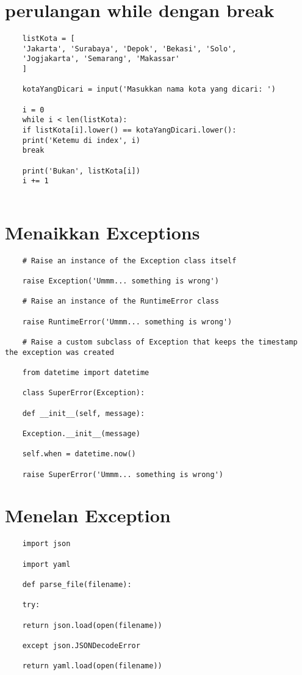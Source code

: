 \documentclass{article}
\begin{document}
\section {perulangan while dengan break}
\begin{lstlisting}
	listKota = [
	'Jakarta', 'Surabaya', 'Depok', 'Bekasi', 'Solo',
	'Jogjakarta', 'Semarang', 'Makassar'
	]
	
	kotaYangDicari = input('Masukkan nama kota yang dicari: ')
	
	i = 0
	while i < len(listKota):
	if listKota[i].lower() == kotaYangDicari.lower():
	print('Ketemu di index', i)
	break
	
	print('Bukan', listKota[i])
	i += 1
	
\end{lstlisting}

\section {Menaikkan Exceptions}
\begin{lstlisting}
	# Raise an instance of the Exception class itself
	
	raise Exception('Ummm... something is wrong')
	
	# Raise an instance of the RuntimeError class
	
	raise RuntimeError('Ummm... something is wrong')
	
	# Raise a custom subclass of Exception that keeps the timestamp the exception was created
	
	from datetime import datetime
	
	class SuperError(Exception):
	
	def __init__(self, message):
	
	Exception.__init__(message)
	
	self.when = datetime.now()
	
	raise SuperError('Ummm... something is wrong')
\end{lstlisting}

\section {Menelan Exception}
\begin{lstlisting}
	import json
	
	import yaml
	
	def parse_file(filename):
	
	try:
	
	return json.load(open(filename))
	
	except json.JSONDecodeError
	
	return yaml.load(open(filename))
\end{lstlisting}
\end{document}
